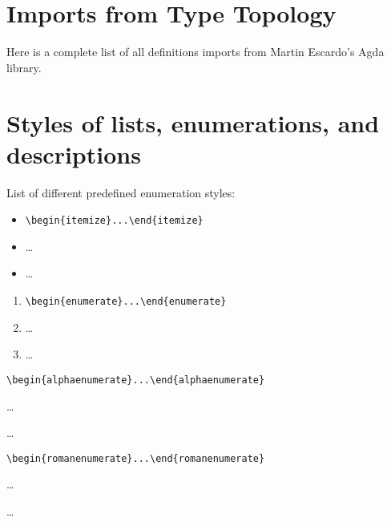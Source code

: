 \documentclass[a4paper,USenglish,cleveref,autoref,thm-restate]{lipics-v2019}
\begin{document}

\appendix

\section{Imports from Type Topology}\label{sec:imports-from-type-topology}
Here is a complete list of all definitions \agdaualib imports from Martin Escardo's \typetopology Agda library.
\begin{code}  \end{code}

\section{Styles of lists, enumerations, and descriptions}\label{sec:itemStyles}
List of different predefined enumeration styles:

\begin{itemize}
\item \verb|\begin{itemize}...\end{itemize}|
\item \dots
\item \dots
\end{itemize}

\begin{enumerate}
\item \verb|\begin{enumerate}...\end{enumerate}|
\item \dots
\item \dots
\end{enumerate}

\begin{alphaenumerate}
\item \verb|\begin{alphaenumerate}...\end{alphaenumerate}|
\item \dots
\item \dots
\end{alphaenumerate}

\begin{romanenumerate}
\item \verb|\begin{romanenumerate}...\end{romanenumerate}|
\item \dots
\item \dots
\end{romanenumerate}
\end{document}
